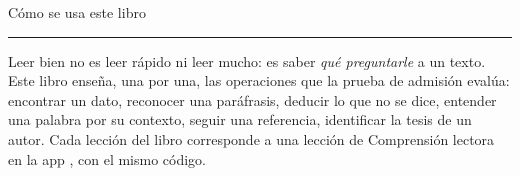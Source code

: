 \cleardoublepage
\thispagestyle{vacia}
{\sffamily\fontsize{26}{30}\selectfont\firalight Cómo se usa este libro\par}\vspace{2pt}
{\color{zolive}\rule{18mm}{1.6pt}}\par\vspace{8pt}

Leer bien no es leer rápido ni leer mucho: es saber \emph{qué preguntarle} a un texto. Este libro enseña, una por una, las
operaciones que la prueba de admisión evalúa: encontrar un dato, reconocer una paráfrasis, deducir lo que no se dice,
entender una palabra por su contexto, seguir una referencia, identificar la tesis de un autor. Cada lección del libro
corresponde a una lección de Comprensión lectora en la app \marca, con el mismo código.

